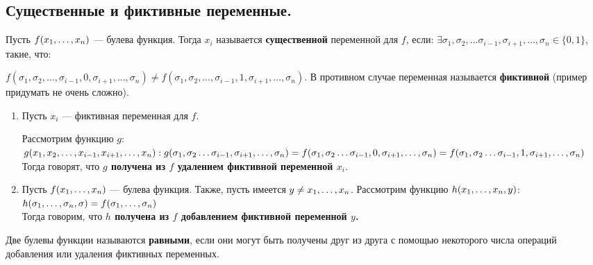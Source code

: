 \subsection{Существенные и фиктивные переменные.} 
\begin{definition}
	Пусть $f(x_1, \ldots, x_n)$ --- булева функция. 
	Тогда $x_i$ называется \textbf{существенной} переменной для $f$, если:  $\exists{\sigma_1,\sigma_2, \ldots \sigma_{i-1}, \sigma_{i+1}, \ldots, \sigma_{n}}\in\{0,1\}$, такие, что: 

$ f(\sigma_1,\sigma_2, \ldots ,\sigma_{i-1}, 0, \sigma_{i+1}, \ldots, \sigma_{n})\neq f(\sigma_1,\sigma_2, \ldots, \sigma_{i-1}, 1, \sigma_{i+1}, \ldots, \sigma_{n}).$
	В противном случае переменная называется \textbf{фиктивной} (пример придумать не очень сложно).
\end{definition}
\begin{enumerate}
	\item 
	Пусть $x_i$ --- фиктивная переменная для $f$. 

    Рассмотрим функцию $g$:
    $g(x_1,x_2,\ldots,x_{i-1},x_{i+1}, \ldots, x_{n}): \\
    g(\sigma_1,\sigma_2 \ldots \sigma_{i-1}, \sigma_{i+1}, \ldots, \sigma_{n})=f(\sigma_1,\sigma_2 \ldots \sigma_{i-1},0, \sigma_{i+1}, \ldots, \sigma_{n}) =f(\sigma_1,\sigma_2 \ldots \sigma_{i-1},1, \sigma_{i+1}, \ldots, \sigma_{n}) $
    Тогда говорят, что  \textbf{$g$ получена из $f$ удалением фиктивной переменной $x_i$}. \\

    \item 
     Пусть $f(x_1, \ldots, x_n)$ --- булева функция. Также, пусть имеется $y \neq x_1, \ldots, x_n $. Рассмотрим функцию $h(x_1, \ldots, x_n,y)$: \\
$h(\sigma_1, \ldots, \sigma_n,\sigma)=f(\sigma_1, \ldots, \sigma_n)$ \\
Тогда говорим, что \textbf{$h$ получена из $f$ добавлением фиктивной переменной  $y$.}

\end{enumerate}
\begin{definition}
	Две булевы функции называются \textbf{равными}, если они могут быть получены друг из друга с помощью некоторого числа операций добавления или удаления фиктивных переменных. \\
\end{definition}
